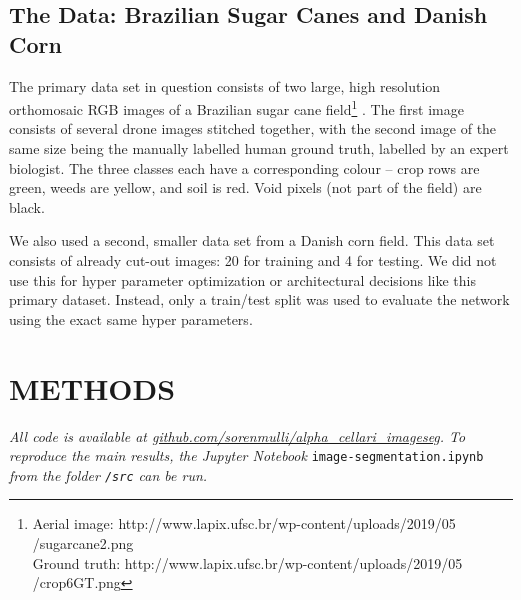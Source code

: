 \documentclass{article}
\begin{document}
\subsection{The Data: Brazilian Sugar Canes and Danish Corn}
The primary data set in question consists of two large, high resolution orthomosaic RGB images of a Brazilian sugar cane field\footnote{Aerial image: http://www.lapix.ufsc.br/wp-content/uploads/2019/05\\/sugarcane2.png\\
Ground truth: http://www.lapix.ufsc.br/wp-content/uploads/2019/05\\/crop6GT.png} \cite{brazil}.
The first image consists of several drone images stitched together, with the second image of the same size being the manually labelled human ground truth, labelled by an expert biologist.
The three classes each have a corresponding colour -- crop rows are green, weeds are yellow, and soil is red.
Void pixels (not part of the field) are black.

We also used a second, smaller data set from a Danish corn field. This data set consists of already cut-out images: 20 for training and 4 for testing.
We did not use this for hyper parameter optimization or architectural decisions like this primary dataset.
Instead, only a train/test split was used to evaluate the network using the exact same hyper parameters. 





\section{METHODS}
\label{sec:format}
\textit{All code is available at \url{github.com/sorenmulli/alpha_cellari_imageseg}. To reproduce the main results, the Jupyter Notebook} \texttt{image-segmentation.ipynb} \textit{from the folder \texttt{/src} can be run.}
\end{document}
